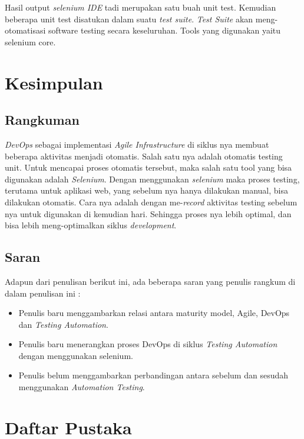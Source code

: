 \documentclass[9pt,twocolumn,twoside]{Gunadarma}
\begin{document}
Hasil output \textit{selenium IDE} tadi merupakan satu buah unit test. Kemudian beberapa unit test disatukan dalam suatu \textit{test suite}. \textit{Test Suite} akan  meng-otomatisasi software testing secara keseluruhan. Tools yang digunakan yaitu selenium core. 

 
\section{Kesimpulan}
\subsection{Rangkuman}
\textit{DevOps} sebagai implementasi \textit{Agile Infrastructure} di siklus nya membuat beberapa aktivitas menjadi otomatis. Salah satu nya adalah otomatis testing unit. Untuk mencapai proses otomatis tersebut, maka salah satu tool yang bisa digunakan adalah \textit{Selenium}. Dengan menggunakan \textit{selenium} maka proses testing, terutama untuk aplikasi web, yang sebelum nya hanya dilakukan manual, bisa dilakukan otomatis. Cara nya adalah dengan me-\textit{record} aktivitas testing sebelum nya untuk digunakan di kemudian hari. Sehingga proses nya lebih optimal, dan bisa lebih meng-optimalkan siklus \textit{development}.    
 

\subsection{Saran}
Adapun dari penulisan berikut ini, ada beberapa saran yang penulis rangkum di dalam penulisan ini :
\begin{itemize}
\item Penulis baru menggambarkan relasi antara maturity model, Agile, DevOps dan \textit{Testing Automation}. 
\item Penulis baru menerangkan proses DevOps di siklus \textit{Testing Automation} dengan menggunakan selenium. 
\item Penulis belum menggambarkan perbandingan antara sebelum dan sesudah menggunakan \textit{Automation Testing}. 
\end{itemize}

\section{Daftar Pustaka}






\end{document}
